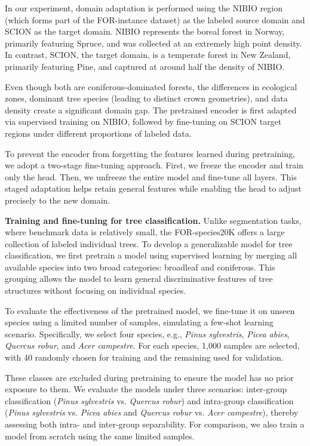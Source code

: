 \documentclass[review,authoryear]{elsarticle}
\begin{document}
In our experiment, domain adaptation is performed using the NIBIO region (which forms part of the FOR-instance dataset) as the labeled source domain and SCION as the target domain. NIBIO represents the boreal forest in Norway, primarily featuring Spruce, and was collected at an extremely high point density. In contrast, SCION, the target domain, is a temperate forest in New Zealand, primarily featuring Pine, and captured at around half the density of NIBIO. 

Even though both are coniferous-dominated forests, the differences in ecological zones, dominant tree species (leading to distinct crown geometries), and data density create a significant domain gap. The pretrained encoder is first adapted via supervised training on NIBIO, followed by fine-tuning on SCION target regions under different proportions of labeled data. 

To prevent the encoder from forgetting the features learned during pretraining, we adopt a two-stage fine-tuning approach. First, we freeze the encoder and train only the head. Then, we unfreeze the entire model and fine-tune all layers. This staged adaptation helps retain general features while enabling the head to adjust precisely to the new domain.

\textbf{Training and fine-tuning for tree classification.} Unlike segmentation tasks, where benchmark data is relatively small, the FOR-species20K offers a large collection of labeled individual trees. To develop a generalizable model for tree classification, we first pretrain a model using supervised learning by merging all available species into two broad categories: broadleaf and coniferous. This grouping allows the model to learn general discriminative features of tree structures without focusing on individual species. 

To evaluate the effectiveness of the pretrained model, we fine-tune it on unseen species using a limited number of samples, simulating a few-shot learning scenario. Specifically, we select four species, e.g., \textit{Pinus sylvestris}, \textit{Picea abies}, \textit{Quercus robur}, and \textit{Acer campestre}. For each species, 1,000 samples are selected, with 40 randomly chosen for training and the remaining used for validation. 

These classes are excluded during pretraining to ensure the model has no prior exposure to them. We evaluate the models under three scenarios: inter-group classification (\textit{Pinus sylvestris} vs. \textit{Quercus robur}) and intra-group classification (\textit{Pinus sylvestris} vs. \textit{Picea abies} and \textit{Quercus robur} vs. \textit{Acer campestre}), thereby assessing both intra- and inter-group separability. For comparison, we also train a model from scratch using the same limited samples. 
\end{document}
